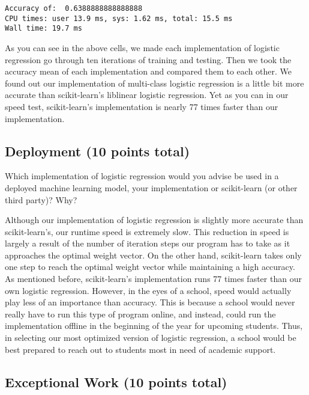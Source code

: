 \documentclass[11pt]{article}
\begin{document}
    \begin{Verbatim}[commandchars=\\\{\}]
Accuracy of:  0.6388888888888888
CPU times: user 13.9 ms, sys: 1.62 ms, total: 15.5 ms
Wall time: 19.7 ms

    \end{Verbatim}

    As you can see in the above cells, we made each implementation of
logistic regression go through ten iterations of training and testing.
Then we took the accuracy mean of each implementation and compared them
to each other. We found out our implementation of multi-class logistic
regression is a little bit more accurate than scikit-learn's liblinear
logistic regression. Yet as you can in our speed test, scikit-learn's
implementation is nearly 77 times faster than our implementation.

    \subsection{Deployment (10 points
total)}\label{deployment-10-points-total}

 Which implementation of logistic regression would you advise be used in
a deployed machine learning model, your implementation or scikit-learn
(or other third party)? Why? 

    Although our implementation of logistic regression is slightly more
accurate than scikit-learn's, our runtime speed is extremely slow. This
reduction in speed is largely a result of the number of iteration steps
our program has to take as it approaches the optimal weight vector. On
the other hand, scikit-learn takes only one step to reach the optimal
weight vector while maintaining a high accuracy. As mentioned before,
scikit-learn's implementation runs 77 times faster than our own logistic
regression. However, in the eyes of a school, speed would actually play
less of an importance than accuracy. This is because a school would
never really have to run this type of program online, and instead, could
run the implementation offline in the beginning of the year for upcoming
students. Thus, in selecting our most optimized version of logistic
regression, a school would be best prepared to reach out to students
most in need of academic support.

    \subsection{Exceptional Work (10 points
total)}\label{exceptional-work-10-points-total}
\end{document}
